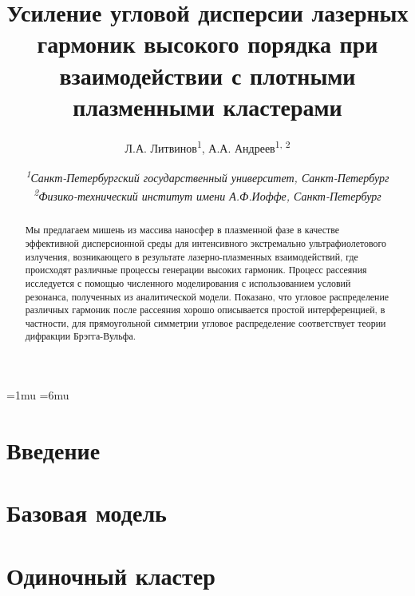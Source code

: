 \documentclass[10pt]{article}
\begin{document}



	\pagestyle{fancy}
	\fancyhf{}
	\fancyhead[L]{\textit{\nouppercase{\leftmark}}}
	\fancyfoot[C]{\thepage}

	\thinmuskip=1mu
	\thickmuskip=6mu
	\def\stacktype{S}\Sstackgap=-4.3pt
	\captionsetup[subfigure]{margin=0.05\textwidth}


	\newcommand{\subfigureautorefname}{\figureautorefname}
	\renewcommand{\thesubfigure}{\asbuk{subfigure}}


	\title{Усиление угловой дисперсии лазерных гармоник высокого порядка при взаимодействии с плотными плазменными кластерами}
	\author{
		Л.А. Литвинов\textsuperscript{1}, А.А. Андреев\textsuperscript{1, 2}
	}
	\date{
		\normalsize{\textit{\textsuperscript{1}Санкт-Петербургский государственный университет, Санкт-Петербург \\ \textsuperscript{2}Физико-технический институт имени А.Ф.Иоффе, Санкт-Петербург}}
	}
	\maketitle

	\begin{abstract}
		Мы предлагаем мишень из массива наносфер в плазменной фазе в качестве эффективной дисперсионной среды для интенсивного экстремально ультрафиолетового излучения, возникающего в результате лазерно-плазменных взаимодействий, где происходят различные процессы генерации высоких гармоник. Процесс рассеяния исследуется с помощью численного моделирования с использованием условий резонанса, полученных из аналитической модели. Показано, что угловое распределение различных гармоник после рассеяния хорошо описывается простой интерференцией, в частности, для прямоугольной симметрии угловое распределение соответствует теории дифракции Брэгга-Вульфа.
	\end{abstract}

	\section{Введение}
	\section{Базовая модель}
	\section{Одиночный кластер}
	
	
	

	\newpage
	
	
\end{document}
